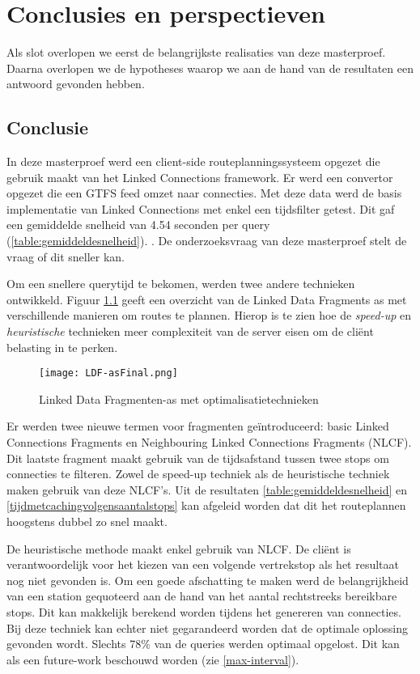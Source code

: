 
\chapter{Conclusies en perspectieven}
\label{hs:conclusie}

Als slot overlopen we eerst de belangrijkste realisaties van deze masterproef. Daarna overlopen we de hypotheses waarop we aan de hand van de resultaten een antwoord gevonden hebben.

\section{Conclusie}

In deze masterproef werd een client-side routeplanningssysteem opgezet die gebruik maakt van het Linked Connections framework. Er werd een convertor opgezet die een GTFS feed omzet naar connecties. Met deze data werd de basis implementatie van Linked Connections met enkel een tijdsfilter getest. Dit gaf een gemiddelde snelheid van 4.54 seconden per query (\ref{table:gemiddeldesnelheid}). . De onderzoeksvraag van deze masterproef stelt de vraag of dit sneller kan. 

Om een snellere querytijd te bekomen, werden twee andere technieken ontwikkeld. Figuur \ref{ldf-opt} geeft een overzicht van de Linked Data Fragments as met verschillende manieren om routes te plannen. Hierop is te zien hoe de \textit{speed-up} en \textit{heuristische} technieken meer complexiteit van de server eisen om de cli\"ent belasting in te perken.

\begin{figure}[h!]
\centering
\texttt{[image: LDF-asFinal.png]}
\caption{Linked Data Fragmenten-as met optimalisatietechnieken}
\label{ldf-opt}
\end{figure}

Er werden twee nieuwe termen voor fragmenten ge\"introduceerd: basic Linked Connections Fragments en Neighbouring Linked Connections Fragments (NLCF). Dit laatste fragment maakt gebruik van de tijdsafstand tussen twee stops om connecties te filteren. Zowel de speed-up techniek als de heuristische techniek maken gebruik van deze NLCF's. Uit de resultaten \ref{table:gemiddeldesnelheid} en \ref{tijdmetcachingvolgensaantalstops} kan afgeleid worden dat dit het routeplannen hoogstens dubbel zo snel maakt.

De heuristische methode maakt enkel gebruik van NLCF. De cli\"ent is verantwoordelijk voor het kiezen van een volgende vertrekstop als het resultaat nog niet gevonden is. Om een goede afschatting te maken werd de belangrijkheid van een station gequoteerd aan de hand van het aantal rechtstreeks bereikbare stops. Dit kan makkelijk berekend worden tijdens het genereren van connecties. Bij deze techniek kan echter niet gegarandeerd worden dat de optimale oplossing gevonden wordt. Slechts 78\% van de queries werden optimaal opgelost. Dit kan als een future-work beschouwd worden (zie \ref{max-interval}).


